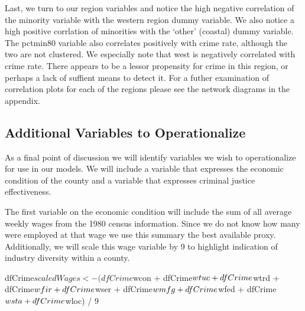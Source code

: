 \documentclass[]{article}
\newenvironment{Shaded}{}{}
\newcommand{\DecValTok}[1]{#1}
\newcommand{\NormalTok}[1]{#1}
\newcommand{\OperatorTok}[1]{#1}
\newcommand{\StringTok}[1]{\textcolor[rgb]{0.00,0.50,0.50}{#1}}
\begin{document}
Last, we turn to our region variables and notice the high negative
correlation of the minority variable with the western region dummy
variable. We also notice a high positive corrlation of minorities with
the `other' (coastal) dummy variable. The pctmin80 variable also
correlates positively with crime rate, although the two are not
clustered. We especially note that west is negatively correlated with
crime rate. There appears to be a lessor propensity for crime in this
region, or perhaps a lack of suffient means to detect it. For a futher
examination of correlation plots for each of the regions please see the
network diagrams in the appendix.

\hypertarget{additional-variables-to-operationalize}{%
\subsection{Additional Variables to
Operationalize}\label{additional-variables-to-operationalize}}

As a final point of discussion we will identify variables we wish to
operationalize for use in our models. We will include a variable that
expresses the economic condition of the county and a variable that
expresses criminal justice effectiveness.

The first variable on the economic condition will include the sum of all
average weekly wages from the 1980 census information. Since we do not
know how many were employed at that wage we use this summary the best
available proxy. Additionally, we will scale this wage variable by 9 to
highlight indication of industry diversity within a county.

\begin{Shaded}
\begin{Highlighting}[]
\NormalTok{dfCrime}\OperatorTok{$}\NormalTok{scaledWages<-(dfCrime}\OperatorTok{$}\NormalTok{wcon }\OperatorTok{+}\StringTok{ }\NormalTok{dfCrime}\OperatorTok{$}\NormalTok{wtuc }\OperatorTok{+}\StringTok{ }\NormalTok{dfCrime}\OperatorTok{$}\NormalTok{wtrd }\OperatorTok{+}\StringTok{ }\NormalTok{dfCrime}\OperatorTok{$}\NormalTok{wfir }\OperatorTok{+}
\StringTok{    }\NormalTok{dfCrime}\OperatorTok{$}\NormalTok{wser }\OperatorTok{+}\StringTok{ }\NormalTok{dfCrime}\OperatorTok{$}\NormalTok{wmfg }\OperatorTok{+}\StringTok{ }\NormalTok{dfCrime}\OperatorTok{$}\NormalTok{wfed }\OperatorTok{+}\StringTok{ }\NormalTok{dfCrime}\OperatorTok{$}\NormalTok{wsta }\OperatorTok{+}\StringTok{ }\NormalTok{dfCrime}\OperatorTok{$}\NormalTok{wloc) }\OperatorTok{/}\StringTok{ }\DecValTok{9}
\end{Highlighting}
\end{Shaded}
\end{document}

